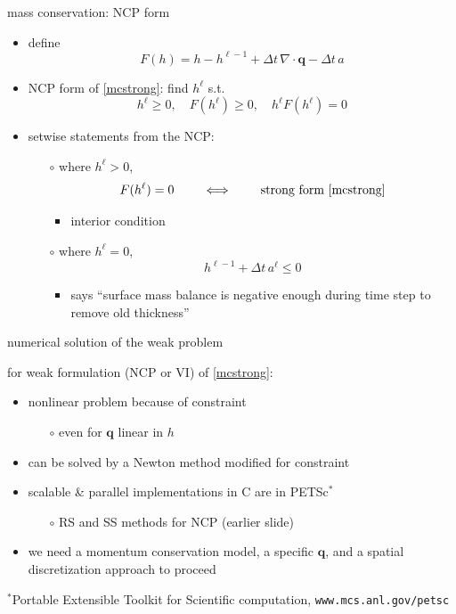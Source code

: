 \documentclass[xcolor={dvipsnames}]{beamer}
\newcommand\bq{\mathbf{q}}
\newcommand\Div{\nabla\cdot}
\begin{document}
\begin{frame}{mass conservation: NCP form}

\begin{itemize}
\item define
    $$F(h) = h - h^{\ell-1} + \Delta t\, \Div \bq - \Delta t\, a$$
\item NCP form of \eqref{mcstrong}: \quad find $h^\ell$ s.t.
   $$h^\ell \ge 0, \quad F(h^\ell) \ge 0, \quad h^\ell F(h^\ell) = 0$$
\item setwise statements from the NCP:
    \begin{itemize}
    \item[$\circ$] where $h^\ell > 0$,
        $$F(h^\ell) = 0 \qquad \iff \qquad \text{strong form \eqref{mcstrong}}$$
        \vspace{-4mm}
        \begin{itemize}
        \item interior condition
        \end{itemize}
    \item[$\circ$] where $h^\ell = 0$,
        $$h^{\ell-1} + \Delta t\, a^\ell \le 0$$
        \vspace{-4mm}
        \begin{itemize}
        \item says ``surface mass balance is negative enough during time step to remove old thickness''
        \end{itemize}
    \end{itemize}
\end{itemize}
\end{frame}


\begin{frame}{numerical solution of the weak problem}

for weak formulation (NCP or VI) of \eqref{mcstrong}:
\begin{itemize}
\item nonlinear problem because of constraint
  \begin{itemize}
  \item[$\circ$]  even for $\bq$ linear in $h$
  \end{itemize}
\item can be solved by a Newton method modified for constraint
\item scalable \& parallel implementations in C are in PETSc$^*$
  \begin{itemize}
  \item[$\circ$]  RS and SS methods for NCP (earlier slide)
  \end{itemize}
\item we need a momentum conservation model, a specific $\bq$, and a spatial discretization approach to proceed
\end{itemize}

\vspace{15mm}
{\scriptsize $^*$Portable Extensible Toolkit for Scientific computation, \texttt{www.mcs.anl.gov/petsc}}
\end{frame}
\end{document}
